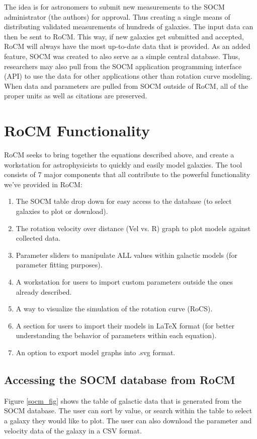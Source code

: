 \documentclass[conference]{IEEEtran-modified}
\begin{document}
The idea is for astronomers to submit new measurements to the SOCM administrator (the authors) for approval. Thus creating a single means of distributing validated measurements of hundreds of galaxies. The input data can then be sent to RoCM. This way, if new galaxies get submitted and accepted, RoCM will always have the most up-to-date data that is provided. As an added feature, SOCM was created to also serve as a simple central database.  Thus, researchers may also pull from the SOCM application programming interface (API) to use the data for other applications other than rotation curve modeling.  When data and parameters are pulled from SOCM outside of RoCM, all of the proper units as well as citations are preserved.



\section{RoCM Functionality}

RoCM seeks to bring together the equations described above, and create a workstation for astrophysicists to quickly and easily model galaxies. The tool consists of 7 major components that all contribute to the powerful functionality we've provided in RoCM:
\begin{enumerate}
       \item The SOCM table drop down for easy access to the database (to select galaxies to plot or download).
       \item The rotation velocity over distance (Vel vs. R) graph to plot models against collected data.
       \item Parameter sliders to manipulate ALL values within galactic models (for parameter fitting purposes).
       \item A workstation for users to import custom parameters outside the ones already described.
        \item A way to visualize the simulation of the rotation curve (RoCS).
       \item A section for users to import their models in LaTeX format (for better understanding the behavior of parameters within each equation). 
       \item An option to export model graphs into .svg format.

\end{enumerate}



\subsection{Accessing the SOCM database from RoCM}
Figure \ref{socm_fig} shows the table of galactic data that is generated from the SOCM database. The user can sort by value, or search within the table to select a galaxy they would like to plot. The user can also download the parameter and velocity data of the galaxy in a CSV format.
\end{document}

